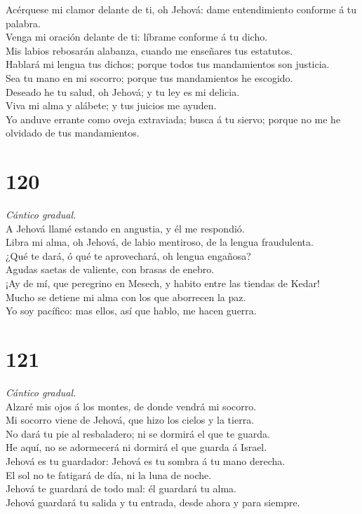  Acérquese mi clamor delante de ti, oh Jehová: dame
entendimiento conforme á tu palabra.\\
 Venga mi oración delante de ti: líbrame conforme á tu
dicho.\\
 Mis labios rebosarán alabanza, cuando me enseñares tus
estatutos.\\
 Hablará mi lengua tus dichos; porque todos tus
mandamientos son justicia.\\
 Sea tu mano en mi socorro; porque tus mandamientos he
escogido.\\
 Deseado he tu salud, oh Jehová; y tu ley es mi delicia.\\
 Viva mi alma y alábete; y tus juicios me ayuden.\\
 Yo anduve errante como oveja extraviada; busca á tu
siervo; porque no me he olvidado de tus mandamientos.

\hypertarget{section-119}{%
\section{120}\label{section-119}}

 \emph{Cántico gradual.}\\
A Jehová llamé estando en angustia, y él me respondió.\\
 Libra mi alma, oh Jehová, de labio mentiroso, de la lengua
fraudulenta.\\
 ¿Qué te dará, ó qué te aprovechará, oh lengua engañosa?\\
 Agudas saetas de valiente, con brasas de enebro.\\
 ¡Ay de mí, que peregrino en Mesech, y habito entre las
tiendas de Kedar!\\
 Mucho se detiene mi alma con los que aborrecen la paz.\\
 Yo soy pacífico: mas ellos, así que hablo, me hacen guerra.

\hypertarget{section-120}{%
\section{121}\label{section-120}}

 \emph{Cántico gradual.}\\
Alzaré mis ojos á los montes, de donde vendrá mi socorro.\\
 Mi socorro viene de Jehová, que hizo los cielos y la
tierra.\\
 No dará tu pie al resbaladero; ni se dormirá el que te
guarda.\\
 He aquí, no se adormecerá ni dormirá el que guarda á
Israel.\\
 Jehová es tu guardador: Jehová es tu sombra á tu mano
derecha.\\
 El sol no te fatigará de día, ni la luna de noche.\\
 Jehová te guardará de todo mal: él guardará tu alma.\\
 Jehová guardará tu salida y tu entrada, desde ahora y para
siempre.

